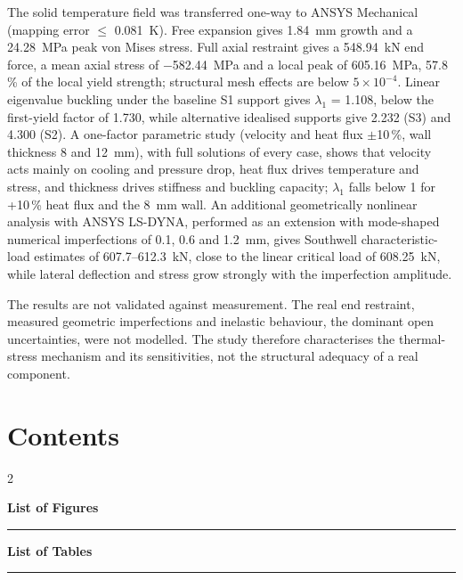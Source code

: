 The solid temperature field was transferred one-way to ANSYS Mechanical (mapping error $\le$ 0.081~K). Free expansion gives 1.84~mm
growth and a 24.28~MPa peak von Mises stress. Full axial restraint gives a 548.94~kN end force, a mean axial stress of $-$582.44~MPa and
a local peak of 605.16~MPa, 57.8\,\% of the local yield strength; structural mesh effects are below
$5\times10^{-4}$. Linear eigenvalue buckling under the baseline S1 support gives $\lambda_1$ = 1.108, below the first-yield factor of 1.730,
while alternative idealised supports give 2.232 (S3) and 4.300 (S2). A one-factor parametric study (velocity and heat flux $\pm$10\,\%,
wall thickness 8 and 12~mm), with full solutions of every case, shows that velocity acts mainly on cooling and pressure drop,
heat flux drives temperature and stress, and thickness drives stiffness and buckling capacity; $\lambda_1$ falls below 1 for +10\,\% heat
flux and the 8~mm wall. An additional geometrically nonlinear analysis with ANSYS LS-DYNA, performed as an extension with mode-shaped
numerical imperfections of 0.1, 0.6 and 1.2~mm, gives Southwell characteristic-load estimates of 607.7--612.3~kN, close to the linear
critical load of 608.25~kN, while lateral deflection and stress grow strongly with the imperfection amplitude.

The results are not validated against measurement. The real end restraint, measured geometric imperfections and
inelastic behaviour, the dominant open uncertainties, were not modelled. The study therefore characterises the thermal-stress mechanism and its sensitivities, not the
structural adequacy of a real component.

\cleardoublepage
\chapter*{Contents}
{\small\makeatletter\setlength{\columnsep}{8mm}\begin{multicols}{2}\end{multicols}\makeatother}
\clearpage
{}
{}
{\sffamily\bfseries\LARGE List of Figures\par}\vspace{2pt}\hrule\vspace{8pt}
{\makeatletter\let\origaddvspace\addvspace\renewcommand{\addvspace}[1]{\origaddvspace{2pt}}\makeatother}
\vspace{14pt}
{}
{\sffamily\bfseries\LARGE List of Tables\par}\vspace{2pt}\hrule\vspace{8pt}
{\makeatletter\let\origaddvspace\addvspace\renewcommand{\addvspace}[1]{\origaddvspace{2pt}}\makeatother}

